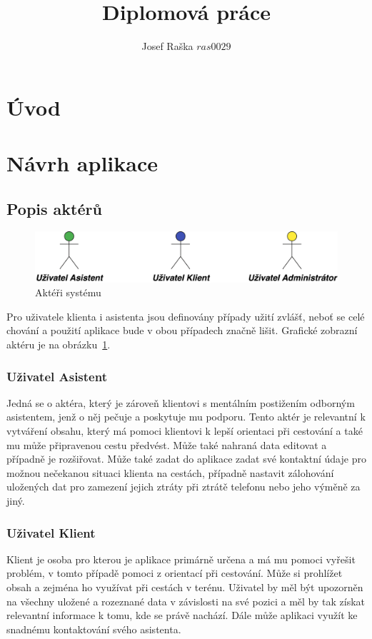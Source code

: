 \documentclass{article}
\title{Diplomová práce}
\author{Josef Raška \(ras0029\)}
\begin{document}
{}

\tableofcontents
\listoffigures
\listoftables

\newpage

\section{Úvod}

\section{Návrh aplikace}
\subsection{Popis aktérů}
\begin{figure}[H]
        \centering
                \includegraphics[scale=0.14]{img/actors.png}
        \caption{Aktéři systému}
        \label{fig:actors}
\end{figure}

Pro uživatele klienta i asistenta jsou definovány případy užití zvlášť, neboť se celé chování
a použití aplikace bude v obou případech značně lišit. Grafické zobrazní aktéru je na obrázku~\ref{fig:actors}.

\subsubsection{Uživatel Asistent}
Jedná se o aktéra, který je zároveň klientovi s mentálním postižením odborným asistentem,
jenž o něj pečuje a poskytuje mu podporu. Tento aktér je relevantní k vytváření obsahu,
který má pomoci klientovi k lepší orientaci při cestování a také mu může připravenou
cestu předvést. Může také nahraná data editovat a případně je rozšiřovat. Může také zadat
do aplikace zadat své kontaktní údaje pro možnou nečekanou situaci klienta na cestách, případně
nastavit zálohování uložených dat pro zamezení jejich ztráty při ztrátě telefonu nebo jeho výměně
za jiný.

\subsubsection{Uživatel Klient}
Klient je osoba pro kterou je aplikace primárně určena a má mu pomoci vyřešit problém,
v tomto případě pomoci z orientací při cestování. Může si prohlížet obsah a zejména ho
využívat při cestách v terénu. Uživatel by měl být upozorněn na všechny uložené a rozeznané
data v závislosti na své pozici a měl by tak získat relevantní informace k tomu, kde se právě
nachází. Dále může aplikaci využít ke snadnému kontaktování svého asistenta.
\end{document}
